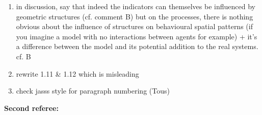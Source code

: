 \documentclass[11pt,a4paper,sans]{moderncv}        %
\begin{document}
\begin{enumerate}
  \item in discussion, say that indeed the indicators can themselves be influenced by geometric structures (cf. comment B) but on the processes, there is nothing obvious about the influence of structures on behavioural spatial patterns (if you imagine a model with no interactions between agents for example) + it's a difference between the model and its potential addition to the real systems. cf. B
  
  \item rewrite 1.11 \& 1.12 which is misleading

    \item check jasss style for paragraph numbering (Tous)
 

\end{enumerate}


\bigskip
\bigskip

\textbf{Second referee:}
 


\medskip
\end{document}
